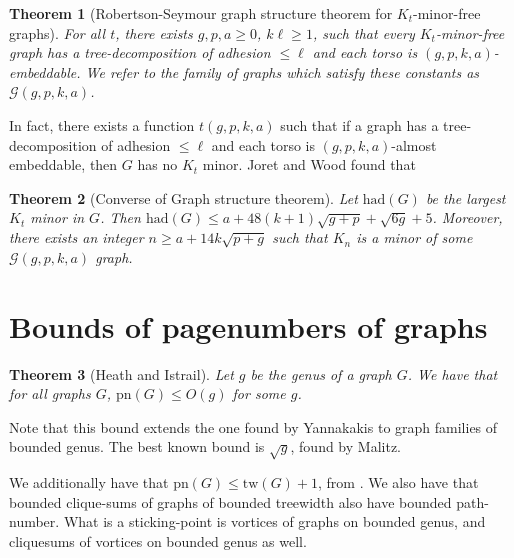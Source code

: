 \documentclass[]{article}
\newcommand{\tw}{\text{tw}}
\newcommand{\had}{\text{had}}
\newcommand{\pn}{\text{pn}}
\newtheorem{theorem}{Theorem}
\theoremstyle{definition}
\numberwithin{theorem}{section}
\numberwithin{equation}{section}
\begin{document}
\begin{theorem}[Robertson-Seymour graph structure theorem for $K_t$-minor-free graphs]
	For all $t$, there exists $g, p, a \geq 0$, $k \ell \geq 1$, such that every $K_t$-minor-free graph has a tree-decomposition of adhesion $\leq \ell$ and each torso is $(g, p, k, a)$-embeddable. We refer to the family of graphs which satisfy these constants as $\mathcal{G}(g, p, k, a)$. 
\end{theorem}
In fact, there exists a function $t(g, p, k, a)$ such that if a graph has a tree-decomposition of adhesion $\leq \ell$ and each torso is $(g, p, k, a)$-almost embeddable, then $G$ has no $K_t$ minor. Joret and Wood\cite{joretCompleteGraphMinors2013} found that
\begin{theorem}[Converse of Graph structure theorem\cite{joretCompleteGraphMinors2013}]\label{thm:graph_structure_bound_theorem}
	Let $\had(G)$ be the largest $K_t$ minor in $G$. Then 
	 $\had(G) \leq a + 48(k + 1)\sqrt{g + p} + \sqrt{6g} + 5$. Moreover, there exists an integer $n \geq a + 1 4 k\sqrt{p + g}$ such that $K_n$ is a minor of some $\mathcal{G}(g, p, k, a)$ graph.
\end{theorem}

\section{Bounds of pagenumbers of graphs}\label{sec:BoundedPagenumber}
\begin{theorem}[Heath and Istrail\cite{heathPagenumberGenusGraphs1992}]\label{thm:Genus_pagenumber_bound}
	Let $g$ be the genus of a graph $G$. We have that for all graphs $G$, $\pn(G) \leq O(g)$ for some $g$.
\end{theorem}
Note that this bound extends the one found by Yannakakis \cite{yannakakisEmbeddingPlanarGraphs1989} to graph families of bounded genus. 
The best known bound is $\sqrt{g}$, found by Malitz\cite{malitzGenusGraphsHave1994}.

We additionally have that $\pn(G) \leq \tw(G) + 1$, from \cite{ganleyPagenumberTrees2001}. 
We also have that bounded clique-sums of graphs of bounded treewidth also have bounded path-number.
What is a sticking-point is vortices of graphs on bounded genus, and cliquesums of vortices on bounded genus as well. 
\end{document}
